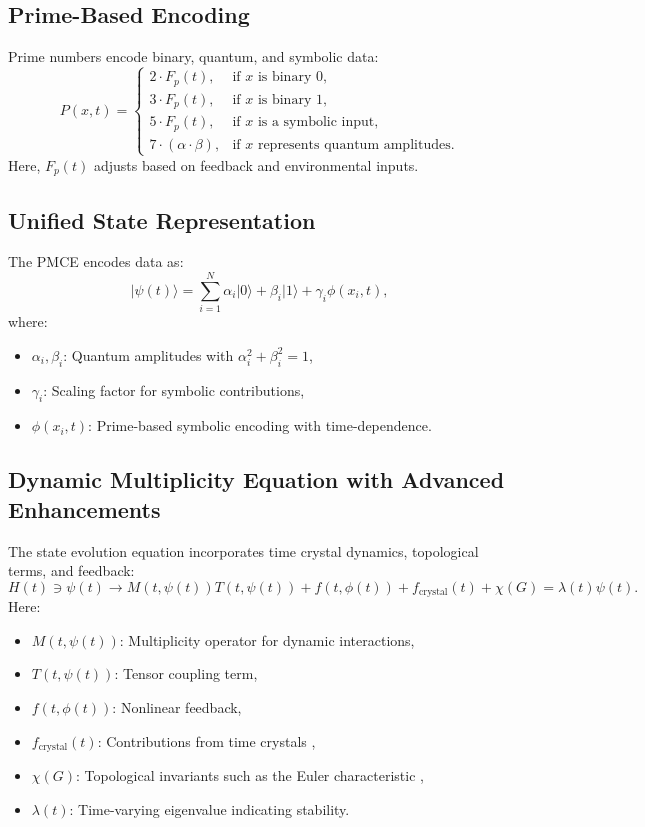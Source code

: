 \documentclass{article}
\theoremstyle{plain}
\begin{document}
\subsection{Prime-Based Encoding}
Prime numbers encode binary, quantum, and symbolic data:
\begin{equation}
P(x, t) = 
\begin{cases}
2 \cdot F_p(t), & \text{if } x \text{ is binary } 0, \\
3 \cdot F_p(t), & \text{if } x \text{ is binary } 1, \\
5 \cdot F_p(t), & \text{if } x \text{ is a symbolic input}, \\
7 \cdot (\alpha \cdot \beta), & \text{if } x \text{ represents quantum amplitudes}.
\end{cases}
\end{equation}
Here, \( F_p(t) \) adjusts based on feedback and environmental inputs.

\subsection{Unified State Representation}
The PMCE encodes data as:
\begin{equation}
\vert \psi(t) \rangle = \sum_{i=1}^N \alpha_i \vert 0 \rangle + \beta_i \vert 1 \rangle + \gamma_i \phi(x_i, t),
\end{equation}
where:
\begin{itemize}
    \item \( \alpha_i, \beta_i \): Quantum amplitudes with \( \alpha_i^2 + \beta_i^2 = 1 \),
    \item \( \gamma_i \): Scaling factor for symbolic contributions,
    \item \( \phi(x_i, t) \): Prime-based symbolic encoding with time-dependence.
\end{itemize}

\subsection{Dynamic Multiplicity Equation with Advanced Enhancements}
The state evolution equation incorporates time crystal dynamics, topological terms, and feedback:
\begin{equation}
H(t) \ni \psi(t) \to M(t, \psi(t)) T(t, \psi(t)) + f(t, \phi(t)) + f_{\text{crystal}}(t) + \chi(G) = \lambda(t) \psi(t).
\end{equation}
Here:
\begin{itemize}
    \item \( M(t, \psi(t)) \): Multiplicity operator for dynamic interactions,
    \item \( T(t, \psi(t)) \): Tensor coupling term,
    \item \( f(t, \phi(t)) \): Nonlinear feedback,
    \item \( f_{\text{crystal}}(t) \): Contributions from time crystals \cite{timecrystals2022},
    \item \( \chi(G) \): Topological invariants such as the Euler characteristic \cite{topology2021},
    \item \( \lambda(t) \): Time-varying eigenvalue indicating stability.
\end{itemize}
\end{document}
